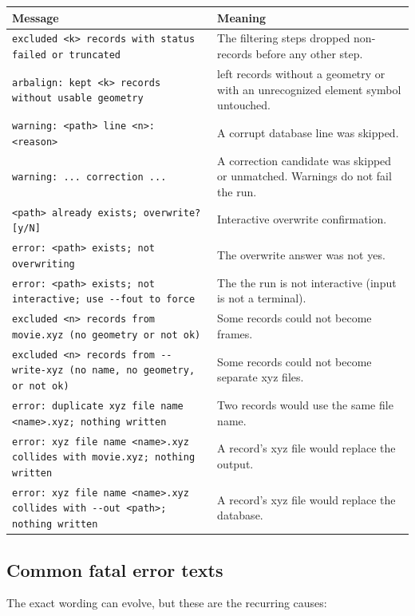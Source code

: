 \begin{longtable}{@{}L{7.0cm}L{6.4cm}@{}}
\toprule
\textbf{Message} & \textbf{Meaning} \\
\midrule
\endhead
\texttt{excluded <k> records with status failed or truncated} & The filtering
steps dropped non- records before any other step. \\
\texttt{arbalign: kept <k> records without usable geometry} &
 left records without a geometry or with an unrecognized
element symbol untouched. \\
\texttt{warning: <path> line <n>: <reason>} & A corrupt database line was
skipped. \\
\texttt{warning: ... correction ...} & A correction candidate was skipped or
unmatched. Warnings do not fail the run. \\
\texttt{<path> already exists; overwrite? [y/N]} & Interactive overwrite
confirmation. \\
\texttt{error: <path> exists; not overwriting} & The overwrite answer was not
yes. \\
\texttt{error: <path> exists; not interactive; use -{}-fout to force} & The
the run is not interactive (input is not a terminal). \\
\texttt{excluded <n> records from movie.xyz (no geometry or not ok)} & Some
records could not become frames. \\
\texttt{excluded <n> records from -{}-write-xyz (no name, no geometry, or
not ok)} & Some records could not become separate xyz files. \\
\texttt{error: duplicate xyz file name <name>.xyz; nothing written} & Two
 records would use the same file name. \\
\texttt{error: xyz file name <name>.xyz collides with movie.xyz; nothing
written} & A record's xyz file would replace the  output. \\
\texttt{error: xyz file name <name>.xyz collides with -{}-out <path>; nothing
written} & A record's xyz file would replace the  database. \\
\bottomrule
\end{longtable}

\subsection{Common fatal error texts}

The exact wording can evolve, but these are the recurring causes:


